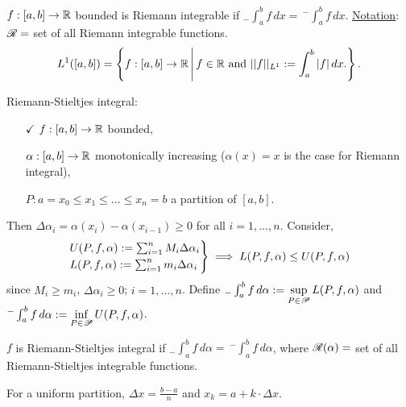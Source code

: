 \documentclass[]{article}
\begin{document}
\begin{definition}
	$f:[a,b]\rightarrow\mathbb{R}$ bounded is Riemann integrable if $_-\int_a^bf\,dx =\, ^-\int_a^b f\,dx$.
	\ul{Notation}: $\mathscr{R} = $ set of all Riemann integrable functions. 
	$$L^1([a,b]) = \left\{ f:[a,b]\rightarrow\mathbb{R} \, \middle| \, f\in\mathbb{R}\text{ and }||f||_{L^1}:=\int_a^b|f|\,dx. \right\}.$$
\end{definition}
Riemann-Stieltjes integral:
\begin{enumerate}
	\item[$\checkmark$] $f:[a,b]\rightarrow\mathbb{R}$ bounded,
	\item[] $\alpha:[a,b]\rightarrow\mathbb{R}$ monotonically increasing ($\alpha(x)=x$ is the case for Riemann integral),
	\item[] $P:a=x_0\leq x_1\leq\dots\leq x_n=b$ a partition of $[a,b]$.
\end{enumerate}
Then $\Delta \alpha_i = \alpha(x_i)-\alpha(x_{i-1})\geq 0$ for all $i=1,\dots,n$.
Consider,
\begin{align*}
	\begin{rcases} U(P,f,\alpha) := \sum_{i=1}^n M_i\Delta\alpha_i \\ L(P,f,\alpha) := \sum_{i=1}^n m_i\Delta \alpha_i \end{rcases} \implies L(P,f,\alpha)\leq U(P,f,\alpha)
\end{align*}
since $M_i\geq m_i$, $\Delta\alpha_i\geq0$; $i=1,\dots,n$.
Define $_-\int_a^b f\,d\alpha := \displaystyle\sup_{P\in\mathscr{P}} L(P,f,\alpha)$ and $^-\int_a^b f\,d\alpha := \displaystyle\inf_{P\in\mathscr{P}} U(P,f,\alpha)$.
\begin{definition}
	 $f$ is Riemann-Stieltjes integral if $_-\int_a^bf\,d\alpha =\, ^-\int_a^bf\,d\alpha$, where $\mathscr{R}(\alpha) = $ set of all Riemann-Stieltjes integrable functions.
\end{definition}
\begin{remark}
	For a uniform partition, $\Delta x = \frac{b-a}n$ and $x_k = a+k\cdot\Delta x$.
\end{remark}
\end{document}
